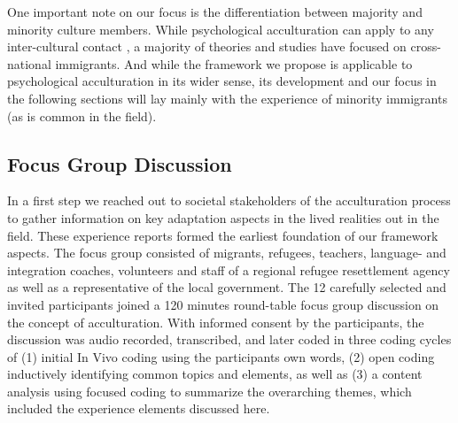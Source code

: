 \documentclass[man, 12pt, a4paper]{apa7}
\begin{document}
One important note on our focus is the differentiation between majority and minority culture members. While psychological acculturation can apply to any inter-cultural contact \citep[including, for example, the contact between indigenous people and colonial settlers, e.g.,][]{Berry1974}, a majority of theories and studies have focused on cross-national immigrants. And while the framework we propose is applicable to psychological acculturation in its wider sense, its development and our focus in the following sections will lay mainly with the experience of minority immigrants (as is common in the field).

\subsection{Focus Group Discussion}
In a first step we reached out to societal stakeholders of the acculturation process to gather information on key adaptation aspects in the lived realities out in the field. These experience reports formed the earliest foundation of our framework aspects. The focus group consisted of migrants, refugees, teachers, language- and integration coaches, volunteers and staff of a regional refugee resettlement agency as well as a representative of the local government. The 12 carefully selected and invited participants joined a 120 minutes round-table focus group discussion on the concept of acculturation. With informed consent by the participants, the discussion was audio recorded, transcribed, and later coded in three coding cycles of (1) initial In Vivo coding using the participants own words, (2) open coding inductively identifying common topics and elements, as well as (3) a content analysis using focused coding to summarize the overarching themes, which included the experience elements discussed here.
\end{document}
